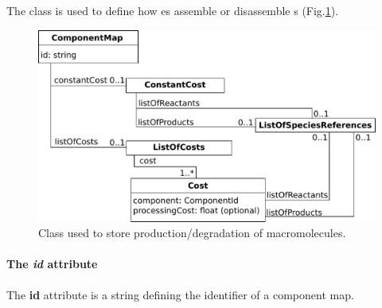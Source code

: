 The \componentmap{} class is used to define how \process{}es assemble or
disassemble \macromolecule{}s (Fig.\ref{fig:processes_component_map}).

\begin{figure}
  \centering
  \includegraphics[scale=0.9]{figures/processes_component_map}
  \caption{Class used to store production/degradation of macromolecules.}
\label{fig:processes_component_map}
\end{figure}

\paragraph{The \textit{id} attribute}
The \textbf{id} attribute is a string defining the identifier of a
component map.
